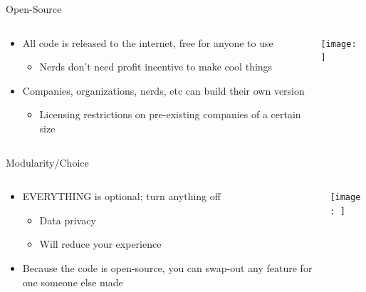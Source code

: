 \documentclass[aspectratio=169]{beamer}
\begin{document}
\begin{frame}{Open-Source}
\begin{columns}[T]
    \begin{column}[T]{0.5\textwidth}
        \begin{itemize}
            \item All code is released to the internet, free for anyone to use
            \begin{itemize}
                \item Nerds don't need profit incentive to make cool things
            \end{itemize}
            \item Companies, organizations, nerds, etc can build their own version
            \begin{itemize}
                \item Licensing restrictions on pre-existing companies of a certain size
            \end{itemize}
        \end{itemize}
    \end{column}
    \begin{column}{0.5\textwidth}
        \texttt{[image: ]}
    \end{column}
\end{columns}
\end{frame}

\begin{frame}{Modularity/Choice}
\begin{columns}[T]
    \begin{column}[T]{0.5\textwidth}
        \begin{itemize}
            \item EVERYTHING is optional; turn anything off
            \begin{itemize}
                \item Data privacy
                \item Will reduce your experience
            \end{itemize}
            \item Because the code is open-source, you can swap-out any feature for one someone else made
        \end{itemize}
    \end{column}
    \begin{column}{0.5\textwidth}
        \texttt{[image: ]}
    \end{column}
\end{columns}
\end{frame}
\end{document}
